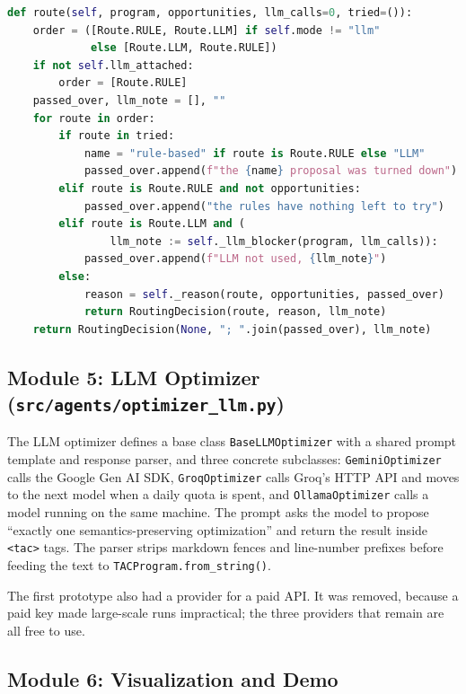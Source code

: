 \documentclass[12pt,a4paper]{report}
\begin{document}
\begin{lstlisting}[language=Python, caption={The routing decision (trimmed, from \texttt{optimization\_specialist.py})}, label=lst:route]
def route(self, program, opportunities, llm_calls=0, tried=()):
    order = ([Route.RULE, Route.LLM] if self.mode != "llm"
             else [Route.LLM, Route.RULE])
    if not self.llm_attached:
        order = [Route.RULE]
    passed_over, llm_note = [], ""
    for route in order:
        if route in tried:
            name = "rule-based" if route is Route.RULE else "LLM"
            passed_over.append(f"the {name} proposal was turned down")
        elif route is Route.RULE and not opportunities:
            passed_over.append("the rules have nothing left to try")
        elif route is Route.LLM and (
                llm_note := self._llm_blocker(program, llm_calls)):
            passed_over.append(f"LLM not used, {llm_note}")
        else:
            reason = self._reason(route, opportunities, passed_over)
            return RoutingDecision(route, reason, llm_note)
    return RoutingDecision(None, "; ".join(passed_over), llm_note)
\end{lstlisting}

\subsection{Module 5: LLM Optimizer (\texttt{src/agents/optimizer\_llm.py})}

The LLM optimizer defines a base class \texttt{BaseLLMOptimizer} with a shared prompt template and response parser, and three concrete subclasses: \texttt{GeminiOptimizer} calls the Google Gen AI SDK, \texttt{GroqOptimizer} calls Groq's HTTP API and moves to the next model when a daily quota is spent, and \texttt{OllamaOptimizer} calls a model running on the same machine. The prompt asks the model to propose ``exactly one semantics-preserving optimization'' and return the result inside \texttt{<tac>} tags. The parser strips markdown fences and line-number prefixes before feeding the text to \texttt{TACProgram.from\_string()}.

The first prototype also had a provider for a paid API. It was removed, because a paid key made large-scale runs impractical; the three providers that remain are all free to use.

\subsection{Module 6: Visualization and Demo}
\end{document}
